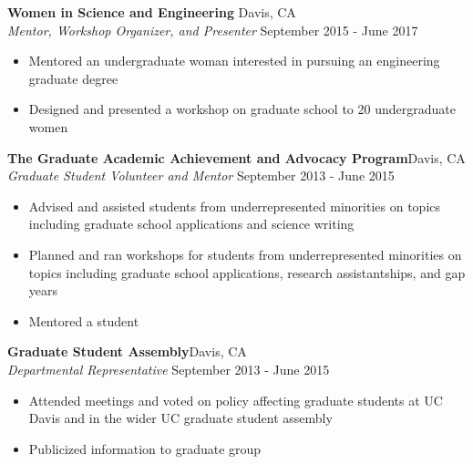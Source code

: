 \documentclass[line,margin,10pt]{res}
\begin{document}
\begin{resume}
\textbf{Women in Science and Engineering}\hfill
Davis, CA\\
{\sl Mentor, Workshop Organizer, and Presenter} \hfill September 2015 - June 2017
\begin{itemize}
\item Mentored an undergraduate woman interested in pursuing an engineering graduate degree
\item Designed and presented a workshop on graduate school to 20 undergraduate women
\end{itemize}

\textbf{The Graduate Academic Achievement and Advocacy Program}\hfill Davis, CA\\{\sl Graduate Student Volunteer and Mentor} \hfill September 2013 - June 2015
\begin{itemize}
\item Advised and assisted students from underrepresented minorities on topics including graduate school applications and science writing
\item Planned and ran workshops for students from underrepresented minorities on topics including graduate school applications, research assistantships, and gap years
\item Mentored a student
\end{itemize}

\textbf{Graduate Student Assembly}\hfill Davis, CA\\{\sl Departmental Representative} \hfill September 2013 - June 2015
\begin{itemize}
\item Attended meetings and voted on policy affecting graduate students at UC Davis and in the wider UC graduate student assembly
\item Publicized information to graduate group
\end{itemize}
 


\end{resume}
\end{document}
